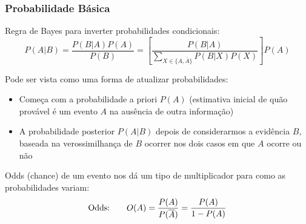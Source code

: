 \documentclass[compress]{beamer}
\def\myblue#1{\textcolor{texblue}{#1}}
\begin{document}
\begin{frame}
\frametitle{Probabilidade Básica}
\pause

\myblue{Regra de Bayes} para inverter probabilidades condicionais:
\begin{equation}
\nonumber
P(A|B) = \frac{P(B|A)P(A)}{P(B)} = \left[\frac{P(B|A)}{\sum_{X \in \{ A, \overline{A}\}} P(B|X)P(X)}\right]P(A)
\end{equation}

\pause
Pode ser vista como uma forma de atualizar probabilidades:  
\begin{itemize}
\pause
\item Começa com a probabilidade \myblue{a priori} $P(A)$ (estimativa inicial de quão provável é um evento $A$ na ausência de outra informação)

\pause
\item A \myblue{probabilidade posterior} $P(A|B)$ depois de considerarmos a evidência $B$, baseada na verossimilhança de $B$ ocorrer nos dois casos em que $A$ ocorre ou não
\end{itemize}

\pause
\myblue{Odds} (chance) de um evento nos dá um tipo de multiplicador para como as probabilidades variam:
\begin{equation}
\nonumber
\mbox{Odds:\qquad } O(A) = \frac{P(A)}{P(\overline{A})} = \frac{P(A)}{1 - P(A)}\label{O-notation}
\end{equation}
\end{frame}
\end{document}
